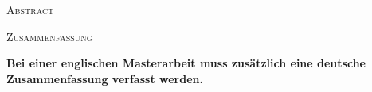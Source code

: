 \begin{center}\large\textsc{Abstract}\end{center}
\lipsum[1]

\clearpage

\begin{center}\large\textsc{Zusammenfassung}\end{center}
\textbf{Bei einer englischen Masterarbeit muss zus\"atzlich eine deutsche Zusammenfassung verfasst werden.}
\lipsum[1]
